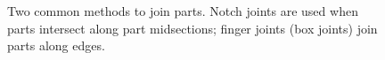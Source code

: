 \begin{figure}[h]
\centering 
{}
\caption{Two common methods to join parts. Notch joints are used when
  parts intersect along part midsections; finger joints (box joints)
  join parts along edges.}
\label{fig:joint}
\end{figure}


